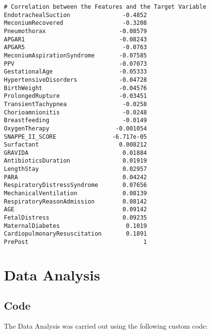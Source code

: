 \documentclass[11pt]{article}
\begin{document}
\begin{Verbatim}[tabsize=4]
# Correlation between the Features and the Target Variable
EndotrachealSuction               -0.4852
MeconiumRecovered                 -0.3208
Pneumothorax                     -0.08579
APGAR1                           -0.08243
APGAR5                            -0.0763
MeconiumAspirationSyndrome       -0.07585
PPV                              -0.07073
GestationalAge                   -0.05333
HypertensiveDisorders            -0.04728
BirthWeight                      -0.04576
ProlongedRupture                 -0.03451
TransientTachypnea                -0.0258
Chorioamnionitis                  -0.0248
Breastfeeding                     -0.0149
OxygenTherapy                   -0.001054
SNAPPE_II_SCORE                -6.717e-05
Surfactant                       0.008212
GRAVIDA                           0.01884
AntibioticsDuration               0.01919
LengthStay                        0.02957
PARA                              0.04242
RespiratoryDistressSyndrome       0.07656
MechanicalVentilation             0.08139
RespiratoryReasonAdmission        0.08142
AGE                               0.09142
FetalDistress                     0.09235
MaternalDiabetes                   0.1019
CardiopulmonaryResuscitation       0.1891
PrePost                                 1
\end{Verbatim}

\section{Data Analysis} \subsection{Code}The Data Analysis was carried out using the following custom code:
\end{document}
